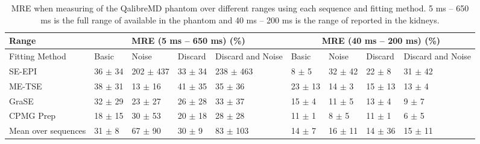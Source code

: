 \begin{table}[H]
	\centering
	\begin{adjustbox}{width=1.0\textwidth, center}
	\begin{tabularx}{1.3\textwidth}{X|X|X|X|X|X|X|X|X|X}
		\ttwo   Range            & \multicolumn{4}{c|}{MRE   (5 ms – 650 ms) (\%)}                         & \multicolumn{5}{c}{MRE   (40 ms – 200 ms) (\%)}              \\ \hline
		Fitting   Method      & Basic     & Noise     & Discard   & Discard   and Noise & \multicolumn{2}{l|}{Basic}     & Noise      & Discard   & Discard   and Noise \\ \hline
		SE-EPI                & 36 $\pm$  34   & 202 $\pm$  437 & 33 $\pm$  34   & 238 $\pm$  463           & \multicolumn{2}{l|}{8 $\pm$  5}     & 32 $\pm$  42    & 22 $\pm$  8    & 31 $\pm$  42             \\ \hline
		ME-TSE                & 38   $\pm$  31 & 13   $\pm$  16 & 41   $\pm$  35 & 35   $\pm$  36           & \multicolumn{2}{l|}{23   $\pm$  13} & 14   $\pm$  3   & 15   $\pm$  13 & 13   $\pm$  4            \\ \hline
		GraSE                 & 32 $\pm$  29   & 23 $\pm$  27   & 26 $\pm$  28   & 33 $\pm$  37             & \multicolumn{2}{l|}{15 $\pm$  4}    & 11 $\pm$  5     & 13 $\pm$  4    & 9 $\pm$  7               \\ \hline
		CPMG   \ttwo Prep        & 18   $\pm$  15 & 30   $\pm$  53 & 20   $\pm$  18 & 28   $\pm$  28           & \multicolumn{2}{l|}{11   $\pm$  1}  & 8   $\pm$  5    & 11   $\pm$  1  & 6   $\pm$  5             \\ \hline
		Mean   over sequences & 31   $\pm$  8  & 67   $\pm$  90 & 30   $\pm$  9  & 83   $\pm$  103          & \multicolumn{2}{l|}{14   $\pm$  7}  & 16   $\pm$  11  & 14   $\pm$  36 & 15   $\pm$  11          
	\end{tabularx}
	\end{adjustbox}
	\caption{\ac{MRE} when measuring \ttwo of the QalibreMD phantom over different ranges using each sequence and fitting method. 5 ms – 650 ms is the full range of \ttwo available in the phantom and 40 ms – 200 ms is the range of \ttwo reported in the kidneys.}
	\label{tab:t2_phantom_fitting_methods}
\end{table}

